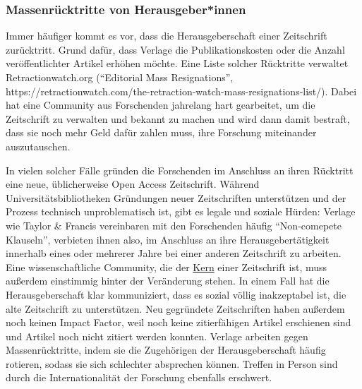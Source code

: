 \documentclass[
  letterpaper,
  DIV=11,
  numbers=noendperiod]{scrreprt}
\begin{document}
\subsubsection{Massenrücktritte von
Herausgeber*innen}\label{massenruxfccktritte-von-herausgeberinnen}

Immer häufiger kommt es vor, dass die Herausgeberschaft einer
Zeitschrift zurücktritt. Grund dafür, dass Verlage die
Publikationskosten oder die Anzahl veröffentlichter Artikel erhöhen
möchte. Eine Liste solcher Rücktritte verwaltet Retractionwatch.org
(``Editorial Mass Resignations'',
https://retractionwatch.com/the-retraction-watch-mass-resignations-list/).
Dabei hat eine Community aus Forschenden jahrelang hart gearbeitet, um
die Zeitschrift zu verwalten und bekannt zu machen und wird dann damit
bestraft, dass sie noch mehr Geld dafür zahlen muss, ihre Forschung
miteinander auszutauschen.

In vielen solcher Fälle gründen die Forschenden im Anschluss an ihren
Rücktritt eine neue, üblicherweise Open Access Zeitschrift. Während
Universitätsbibliotheken Gründungen neuer Zeitschriften unterstützen und
der Prozess technisch unproblematisch ist, gibt es legale und soziale
Hürden: Verlage wie Taylor \& Francis vereinbaren mit den Forschenden
häufig ``Non-comepete Klauseln'', verbieten ihnen also, im Anschluss an
ihre Herausgebertätigkeit innerhalb eines oder mehrerer Jahre bei einer
anderen Zeitschrift zu arbeiten. Eine wissenschaftliche Community, die
der
\href{https://blogs.lse.ac.uk/impactofsocialsciences/2019/03/29/the-value-of-a-journal-is-the-community-it-creates-not-the-papers-it-publishes/}{Kern}
einer Zeitschrift ist, muss außerdem einstimmig hinter der Veränderung
stehen. In einem Fall hat die Herausgeberschaft klar kommuniziert, dass
es sozial völlig inakzeptabel ist, die alte Zeitschrift zu unterstützen.
Neu gegründete Zeitschriften haben außerdem noch keinen Impact Factor,
weil noch keine zitierfähigen Artikel erschienen sind und Artikel noch
nicht zitiert werden konnten. Verlage arbeiten gegen Massenrücktritte,
indem sie die Zugehörigen der Herausgeberschaft häufig rotieren, sodass
sie sich schlechter absprechen können. Treffen in Person sind durch die
Internationalität der Forschung ebenfalls erschwert.
\end{document}
